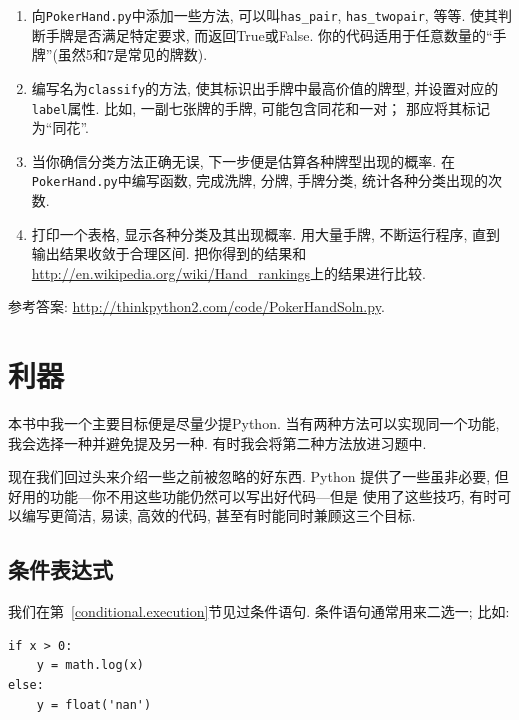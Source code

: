 \documentclass[10pt]{book}
\begin{document}
\begin{exercise}
\begin{enumerate}
\item 向{\tt PokerHand.py}中添加一些方法, 可以叫\verb"has_pair",
\verb"has_twopair", 等等. 使其判断手牌是否满足特定要求, 而返回True或False. 
你的代码适用于任意数量的``手牌''(虽然5和7是常见的牌数). 

\item 编写名为{\tt classify}的方法, 使其标识出手牌中最高价值的牌型, 
并设置对应的{\tt label}属性. 比如, 一副七张牌的手牌, 
可能包含同花和一对；
那应将其标记为``同花''.

\item 当你确信分类方法正确无误, 下一步便是估算各种牌型出现的概率. 
在{\tt PokerHand.py}中编写函数, 完成洗牌, 分牌, 手牌分类, 
统计各种分类出现的次数. 

\item 打印一个表格, 显示各种分类及其出现概率. 
用大量手牌, 不断运行程序, 直到输出结果收敛于合理区间. 
把你得到的结果和\url{http://en.wikipedia.org/wiki/Hand_rankings}上的结果进行比较. 

\end{enumerate}

参考答案: \url{http://thinkpython2.com/code/PokerHandSoln.py}.
\end{exercise}


\chapter{利器}

本书中我一个主要目标便是尽量少提Python. 
当有两种方法可以实现同一个功能, 我会选择一种并避免提及另一种. 
有时我会将第二种方法放进习题中. 

现在我们回过头来介绍一些之前被忽略的好东西. 
Python 提供了一些虽非必要, 但好用的功能---你不用这些功能仍然可以写出好代码---但是
使用了这些技巧, 有时可以编写更简洁, 易读, 高效的代码, 甚至有时能同时兼顾这三个目标. 


\section{条件表达式}

我们在第~\ref{conditional.execution}节见过条件语句. 
条件语句通常用来二选一; 比如:

\begin{verbatim}
if x > 0:
    y = math.log(x)
else:
    y = float('nan')
\end{verbatim}
\end{document}
